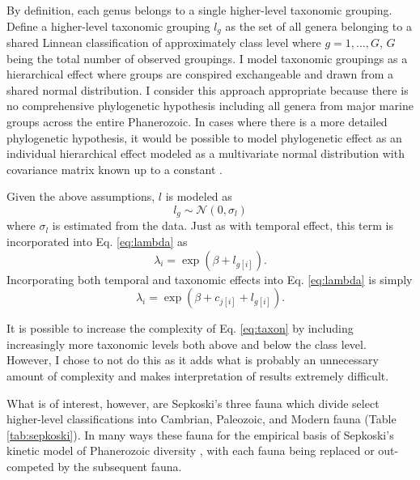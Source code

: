\documentclass[12pt,letterpaper]{article}
\begin{document}
By definition, each genus belongs to a single higher-level taxonomic grouping. Define a higher-level taxonomic grouping \(l_{g}\) as the set of all genera belonging to a shared Linnean classification of approximately class level where \(g = 1, \dots, G\), \(G\) being the total number of observed groupings. I model taxonomic groupings as a hierarchical effect where groups are conspired exchangeable and drawn from a shared normal distribution. I consider this approach appropriate because there is no comprehensive phylogenetic hypothesis including all genera from major marine groups across the entire Phanerozoic. In cases where there is a more detailed phylogenetic hypothesis, it would be possible to model phylogenetic effect as an individual hierarchical effect modeled as a multivariate normal distribution with covariance matrix known up to a constant \citep{Lynch1991,Housworth2004}.

Given the above assumptions, \(l\) is modeled as
\begin{equation}
  l_{g} \sim \mathcal{N}(0, \sigma_{l})
  \label{eq:taxon}
\end{equation}
where \(\sigma_{l}\) is estimated from the data. Just as with temporal effect, this term is incorporated into Eq. \ref{eq:lambda} as
\begin{equation}
  \lambda_{i} = \exp(\beta + l_{g[i]}).
  \label{eq:lambda_taxon}
\end{equation}
Incorporating both temporal and taxonomic effects into Eq. \ref{eq:lambda} is simply
\begin{equation}
  \lambda_{i} = \exp(\beta + c_{j[i]} + l_{g[i]}).
  \label{eq:lambda_full}
\end{equation}

It is possible to increase the complexity of Eq. \ref{eq:taxon} by including increasingly more taxonomic levels both above and below the class level. However, I chose to not do this as it adds what is probably an unnecessary amount of complexity and makes interpretation of results extremely difficult.

What is of interest, however, are Sepkoski's three fauna \citep{SepkoskiJr.1981a} which divide select higher-level classifications into Cambrian, Paleozoic, and Modern fauna (Table \ref{tab:sepkoski}). In many ways these fauna for the empirical basis of Sepkoski's kinetic model of Phanerozoic diversity \citep{Sepkoski1978,Sepkoski1979,Sepkoski1984}, with each fauna being replaced or out-competed by the subsequent fauna. %
\end{document}
